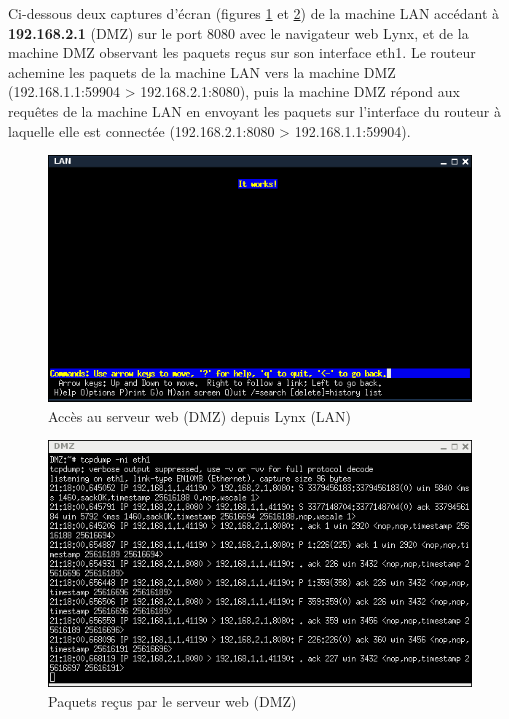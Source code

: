 \documentclass[frenchb, 11pt]{article}
\begin{document}
Ci-dessous deux captures d'écran (figures \ref{fig:sch3lan} et \ref{fig:sch3dmz}) de la machine LAN accédant à \textbf{192.168.2.1} (DMZ) sur le port 8080 avec le navigateur web Lynx, et de la machine DMZ observant les paquets reçus sur son interface eth1. Le routeur achemine les paquets de la machine LAN vers la machine DMZ (192.168.1.1:59904 > 192.168.2.1:8080), puis la machine DMZ répond aux requêtes de la machine LAN en envoyant les paquets sur l'interface du routeur à laquelle elle est connectée (192.168.2.1:8080 > 192.168.1.1:59904).

\begin{figure}[h!]
	\centering
	\includegraphics[scale=0.62]{sch3LAN.png}
	\caption{Accès au serveur web (DMZ) depuis Lynx (LAN)}
	\label{fig:sch3lan}
\end{figure}
\newpage

\begin{figure}[h!]
	\centering
	\includegraphics[scale=0.68]{sch3DMZ.png}
	\caption{Paquets reçus par le serveur web (DMZ)}
	\label{fig:sch3dmz}
\end{figure}
\newpage

\begin{thebibliography}{5}
\end{thebibliography}
\end{document}
